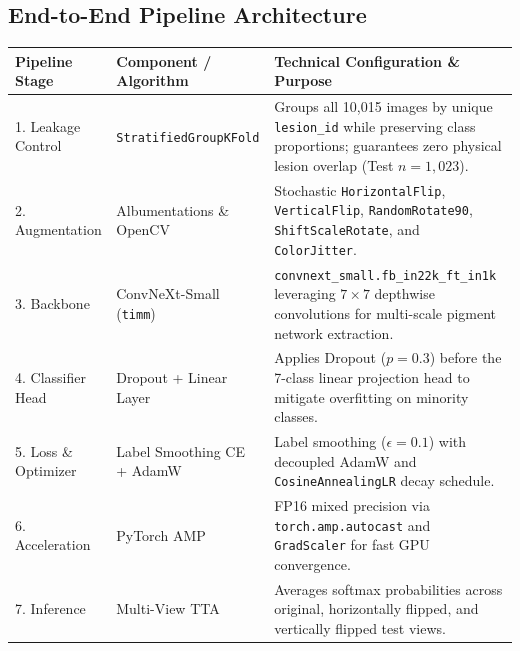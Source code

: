 \documentclass[12pt,a4paper]{article}
\begin{document}
\subsection{End-to-End Pipeline Architecture}
\begin{table}[h!]
\centering
\renewcommand{\arraystretch}{1.25}
\begin{tabularx}{\textwidth}{l l X}
\toprule
\textbf{Pipeline Stage} & \textbf{Component / Algorithm} & \textbf{Technical Configuration \& Purpose} \\
\midrule
1. Leakage Control & \texttt{StratifiedGroupKFold} & Groups all 10,015 images by unique \texttt{lesion\_id} while preserving class proportions; guarantees zero physical lesion overlap (Test $n = 1,023$). \\
2. Augmentation & Albumentations \& OpenCV & Stochastic \texttt{HorizontalFlip}, \texttt{VerticalFlip}, \texttt{RandomRotate90}, \texttt{ShiftScaleRotate}, and \texttt{ColorJitter}. \\
3. Backbone & ConvNeXt-Small (\texttt{timm}) & \texttt{convnext\_small.fb\_in22k\_ft\_in1k} leveraging $7\times 7$ depthwise convolutions for multi-scale pigment network extraction. \\
4. Classifier Head & Dropout + Linear Layer & Applies Dropout ($p = 0.3$) before the 7-class linear projection head to mitigate overfitting on minority classes. \\
5. Loss \& Optimizer & Label Smoothing CE + AdamW & Label smoothing ($\epsilon = 0.1$) with decoupled AdamW and \texttt{CosineAnnealingLR} decay schedule. \\
6. Acceleration & PyTorch AMP & FP16 mixed precision via \texttt{torch.amp.autocast} and \texttt{GradScaler} for fast GPU convergence. \\
7. Inference & Multi-View TTA & Averages softmax probabilities across original, horizontally flipped, and vertically flipped test views. \\
\bottomrule
\end{tabularx}
\end{table}
\end{document}
